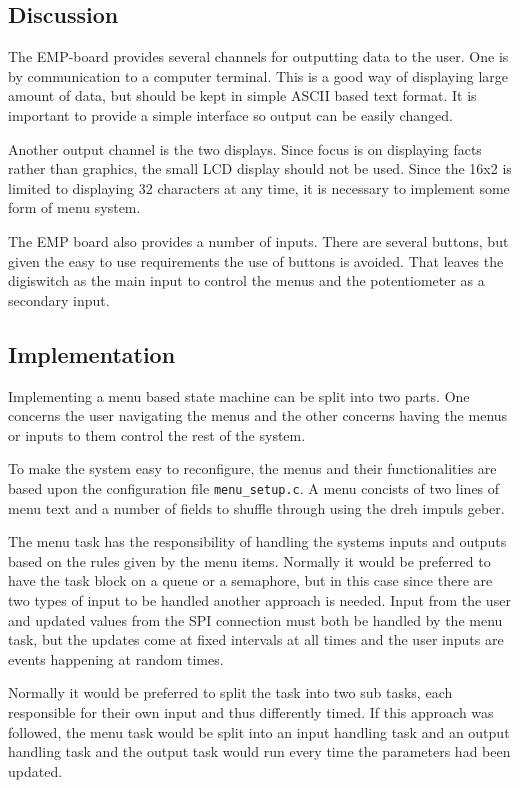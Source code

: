 \subsection{Discussion}
The EMP-board provides several channels for outputting data to the user. One is
by communication to a computer terminal. This is a good way of displaying large
amount of data, but should be kept in simple ASCII based text format. It is
important to provide a simple interface so output can be easily changed.

Another output channel is the two displays. Since focus is on displaying facts
rather than graphics, the small LCD display should not be used. Since the 16x2
is limited to displaying 32 characters at any time, it is necessary to implement
some form of menu system.
 
The EMP board also provides a number of inputs. There are several buttons, but
given the easy to use requirements the use of buttons is avoided. That leaves
the digiswitch as the main input to control the menus and the potentiometer as a
secondary input.



\subsection{Implementation}
Implementing a menu based state machine can be split into two parts. One
concerns the user navigating the menus and the other concerns having the menus or inputs to them
control the rest of the system. 

To make the system easy to reconfigure, the menus and their functionalities are based upon the configuration file \texttt{menu\_setup.c}. A menu concists of two lines of menu text and a number of fields to shuffle through using the dreh impuls geber. 

The menu task has the responsibility of handling the systems inputs and outputs based on the rules given by the menu items. Normally it would be preferred to have the task block on a queue or a semaphore, but in this case since there are two types of input to be handled another approach is needed.  Input from the user and updated values from the SPI connection must both be handled by the menu task, but the updates come at fixed intervals at all times and the user inputs are events happening at random times.

Normally it would be preferred to split the task into two sub tasks, each responsible for their own input and thus differently timed. If this approach was followed, the menu task would be split into an input handling task and an output handling task and the output task would run every time the parameters had been updated. 

